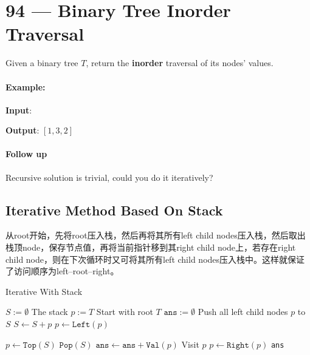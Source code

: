 \section{94 --- Binary Tree Inorder Traversal}
Given a binary tree $T$, return the \textbf{inorder} traversal of its nodes' values.
\paragraph{Example:}
\begin{flushleft}
\textbf{Input}: 
\begin{figure}[H]
\end{figure}
\textbf{Output}: $[1,3,2]$
\end{flushleft}
\paragraph{Follow up}
\begin{flushleft}
Recursive solution is trivial, could you do it iteratively?
\end{flushleft}
\subsection{Iterative Method Based On Stack}
\begin{CJK*}{UTF8}{gbsn}
从root开始，先将root压入栈，然后再将其所有left child nodes压入栈，然后取出栈顶node，保存节点值，再将当前指针移到其right child node上，若存在right child node，则在下次循环时又可将其所有left child nodes压入栈中。这样就保证了访问顺序为left--root--right。
\end{CJK*}
\setcounter{algorithm}{0}
\begin{algorithm}[H]
\caption{Iterative With Stack}
\begin{algorithmic}[1]
\State $S:=\emptyset$ \Comment The stack
\State $p:=T$ \Comment Start with root $T$
\State $\texttt{ans}:=\emptyset$
 \Comment Push all left child nodes $p$ to $S$
\State $S\gets S + p$
\State $p\gets \texttt{Left}(p)$
\EndWhile
{}
\end{algorithmic}
\end{algorithm}
\begin{algorithm}[H]
\begin{algorithmic}[1]
\State $p\gets \texttt{Top}(S)$
\State $\texttt{Pop}(S)$
\State $\texttt{ans}\gets \texttt{ans}+ \texttt{Val}(p)$ \Comment Visit $p$
\State $p\gets \texttt{Right}(p)$
\EndWhile
\State \Return \texttt{ans}
\EndProcedure
\end{algorithmic}
\end{algorithm}